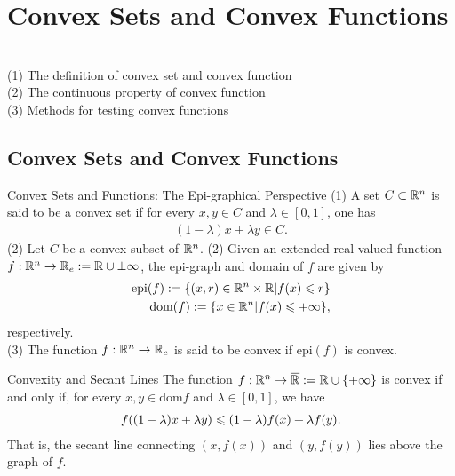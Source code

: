 \chapter{Convex Sets and Convex Functions}

 \\
(1) The definition of convex set and convex function \\
(2) The continuous property of convex function \\
(3) Methods for testing convex functions\\


\section{Convex Sets and Convex Functions}

\begin{definition}{Convex Sets and Functions: The Epi-graphical Perspective}{}
    (1) A set $C\subset \mathbb{R}^n$ is said to be a convex set if for every $x,y\in C$ and $\lambda\in [0,1]$, one has
    \begin{align}
        (1-\lambda)x+\lambda y \in C.
    \end{align}
    (2) Let $C$ be a convex subset of $\mathbb{R}^n$. 
    (2) Given an extended real-valued function $f:\mathbb{R}^n\rightarrow \mathbb{R}_e:=\mathbb{R}\cup {\pm \infty}$,
    the epi-graph and domain of $f$ are given by
    \begin{align}
        \text{epi}(f) := \{(x,r)\in \mathbb{R}^n\times \mathbb{R}|f(x)\leqslant r\} \\
        \text{dom}(f) := \{x\in \mathbb{R}^n|f(x)\leqslant +\infty\},
    \end{align}
    respectively.\\
    (3) The function $f:\mathbb{R}^n\rightarrow \mathbb{R}_e$ is said to be convex if $\text{epi}(f)$ is convex.
\end{definition}

\begin{lemma}{Convexity and Secant Lines}{}
    The function $f:\mathbb{R}^n\rightarrow \overline{\mathbb{R}}:=\mathbb{R}\cup \{+\infty\}$ is convex if and only if,
    for every $x,y\in \text{dom} f$ and $\lambda\in [0,1]$, we have
    \begin{align}
        f((1-\lambda)x+\lambda y) \leqslant (1-\lambda) f(x) +\lambda f(y).
        \label{eq:Convexity and Secant Lines}
    \end{align}
    That is, the secant line connecting $(x,f(x))$ and $(y,f(y))$ lies above the graph of $f$.
\end{lemma}

